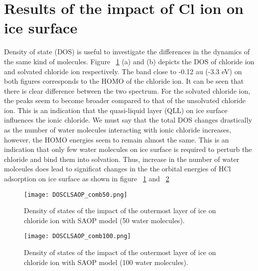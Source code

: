 \documentclass[a4paper,11pt]{report}
\begin{document}
\section{Results of the impact of Cl ion on ice surface}
Density of state (DOS) is useful to investigate the differences in the dynamics of the same kind of molecules. Figure ~\ref{figure1a} (a) and (b) depicts the DOS of chloride ion and solvated chloride ion respectively. The band close to -0.12 au (-3.3 eV) on both figures corresponds to the HOMO of the chloride ion. It can be seen that there is clear difference between the two spectrum. For the solvated chloride ion, the peaks seem to become broader compared to that of the unsolvated chloride ion. This is an indication that the quasi-liquid layer (QLL) on ice surface influences the ionic chloride. We must say that the total DOS changes drastically as the number of water molecules interacting with ionic chloride increases, however, the HOMO energies seem to remain almost the same. This is an indication that only few water molecules on ice surface is required to perturb the chloride and bind them into solvation. Thus, increase in the number of water molceules does lead to significat changes in the the orbital energies of HCl adsorption on ice surface as shown in figure ~\ref{figure1a} and ~\ref{figure2a}

\begin{figure}[H]\large
\texttt{[image: DOSCLSAOP\_comb50.png]}
\caption{Density of states of the impact of the outermost layer of ice on chloride ion with SAOP model (50 water molecules).}
\label{figure1a}
\end{figure}

\begin{figure}[H]\large
\texttt{[image: DOSCLSAOP\_comb100.png]}
\caption{Density of states of the impact of the outermost layer of ice on chloride ion with SAOP model (100 water molecules).}
\label{figure2a}
\end{figure}
\end{document}
